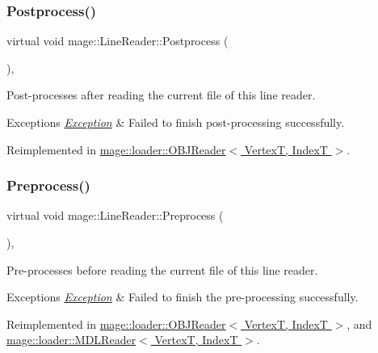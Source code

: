 \subsubsection{\texorpdfstring{Postprocess()}{Postprocess()}}
{\footnotesize\ttfamily virtual void mage\+::\+Line\+Reader\+::\+Postprocess (\begin{DoxyParamCaption}{ }\end{DoxyParamCaption})\hspace{0.3cm}{\ttfamily [private]}, {\ttfamily [virtual]}}

Post-\/processes after reading the current file of this line reader.


\begin{DoxyExceptions}{Exceptions}
{\em \hyperlink{classmage_1_1_exception}{Exception}} & Failed to finish post-\/processing successfully. \\
\hline
\end{DoxyExceptions}


Reimplemented in \hyperlink{classmage_1_1loader_1_1_o_b_j_reader_ae8bc7d40a019523546d61bdfd599c368}{mage\+::loader\+::\+O\+B\+J\+Reader$<$ Vertex\+T, Index\+T $>$}.

\hypertarget{classmage_1_1_line_reader_a4de135cfb0434be786cfcfd7959031ef}{}\label{classmage_1_1_line_reader_a4de135cfb0434be786cfcfd7959031ef} 
\subsubsection{\texorpdfstring{Preprocess()}{Preprocess()}}
{\footnotesize\ttfamily virtual void mage\+::\+Line\+Reader\+::\+Preprocess (\begin{DoxyParamCaption}{ }\end{DoxyParamCaption})\hspace{0.3cm}{\ttfamily [private]}, {\ttfamily [virtual]}}

Pre-\/processes before reading the current file of this line reader.


\begin{DoxyExceptions}{Exceptions}
{\em \hyperlink{classmage_1_1_exception}{Exception}} & Failed to finish the pre-\/processing successfully. \\
\hline
\end{DoxyExceptions}


Reimplemented in \hyperlink{classmage_1_1loader_1_1_o_b_j_reader_a42cb85a0d14f9cc1caff68ae2cf84301}{mage\+::loader\+::\+O\+B\+J\+Reader$<$ Vertex\+T, Index\+T $>$}, and \hyperlink{classmage_1_1loader_1_1_m_d_l_reader_afe56982cb6a6ba9a2ce4abba9cbe3703}{mage\+::loader\+::\+M\+D\+L\+Reader$<$ Vertex\+T, Index\+T $>$}.

